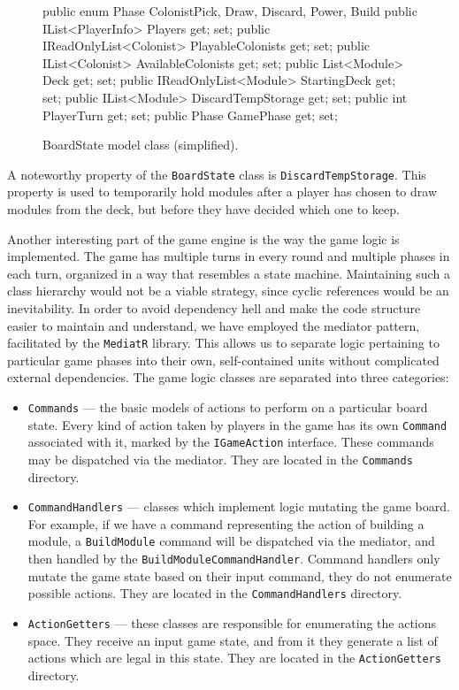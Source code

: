 \begin{figure}[ht]
\begin{code}
    public enum Phase { ColonistPick, Draw, Discard, Power, Build }
    public IList<PlayerInfo> Players { get; set; }
    public IReadOnlyList<Colonist> PlayableColonists { get; set; }
    public IList<Colonist> AvailableColonists { get; set; }
    public List<Module> Deck { get; set; }
    public IReadOnlyList<Module> StartingDeck { get; set; }
    public IList<Module> DiscardTempStorage { get; set; }
    public int PlayerTurn { get; set; }
    public Phase GamePhase { get; set; }
\end{code}
\caption{BoardState model class (simplified).}\label{dd:boardstate}
\end{figure}

A noteworthy property of the \texttt{BoardState} class is \texttt{DiscardTempStorage}.
This property is used to temporarily hold modules after a player has chosen to draw
modules from the deck, but before they have decided which one to keep.

Another interesting part of the game engine is the way the game logic is implemented.
The game has multiple turns in every round and multiple phases in each turn,
organized in a way that resembles a state machine. Maintaining such a class hierarchy
would not be a viable strategy, since cyclic references would be an inevitability.
In order to avoid dependency hell and make the code structure easier to maintain
and understand, we have employed the mediator pattern, facilitated by the
\texttt{MediatR} library. This allows us to separate logic pertaining
to particular game phases into their own, self-contained units without complicated
external dependencies. The game logic classes are separated into three categories:
\begin{itemize}
    \item \texttt{Commands} --- the basic models of actions to perform on
        a particular board state. Every kind of action taken by players in the game
        has its own \texttt{Command} associated with it, marked by the
        \texttt{IGameAction} interface. These commands may be dispatched via
        the mediator. They are located in the \texttt{Commands} directory.
    \item \texttt{CommandHandlers} --- classes which implement logic mutating
        the game board. For example, if we have a command representing the action
        of building a module, a \texttt{BuildModule} command will be dispatched
        via the mediator, and then handled by the \texttt{BuildModuleCommandHandler}.
        Command handlers only mutate the game state based on their input command,
        they do not enumerate possible actions. They are located in the
        \texttt{CommandHandlers} directory.
    \item \texttt{ActionGetters} --- these classes are responsible for
        enumerating the actions space. They receive an input game state,
        and from it they generate a list of actions which are legal
        in this state. They are located in the \texttt{ActionGetters} directory.
\end{itemize}

